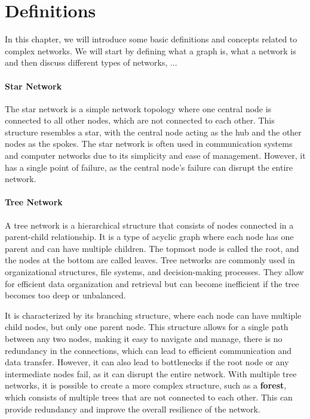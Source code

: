 \chapter{Definitions}

In this chapter, we will introduce some basic definitions and concepts related to complex networks. We will start by defining what a graph is, what a network is and then discuss different types of networks, ...



\subsubsection{Star Network}

The star network is a simple network topology where one central node is connected to all other nodes, which are not connected to each other. This structure resembles a star, with the central node acting as the hub and the other nodes as the spokes. The star network is often used in communication systems and computer networks due to its simplicity and ease of management. However, it has a single point of failure, as the central node's failure can disrupt the entire network.

\subsubsection{Tree Network}

A tree network is a hierarchical structure that consists of nodes connected in a parent-child relationship. It is a type of acyclic graph where each node has one parent and can have multiple children. The topmost node is called the root, and the nodes at the bottom are called leaves. Tree networks are commonly used in organizational structures, file systems, and decision-making processes. They allow for efficient data organization and retrieval but can become inefficient if the tree becomes too deep or unbalanced.

It is characterized by its branching structure, where each node can have multiple child nodes, but only one parent node. This structure allows for a single path between any two nodes, making it easy to navigate and manage, there  is no redundancy in the connections, which can lead to efficient communication and data transfer. However, it can also lead to bottlenecks if the root node or any intermediate nodes fail, as it can disrupt the entire network. With multiple tree networks, it is possible to create a more complex structure, such as a \textbf{forest}, which consists of multiple trees that are not connected to each other. This can provide redundancy and improve the overall resilience of the network.


